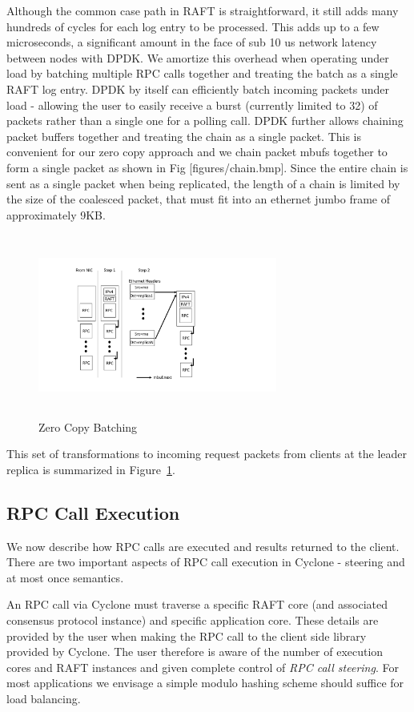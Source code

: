 \documentclass[letterpaper,twocolumn,10pt]{article}
\begin{document}
Although the common case path in RAFT is straightforward, it still adds many
hundreds of cycles for each log entry to be processed. This adds up to a few
microseconds, a significant amount in the face of sub 10 us network latency
between nodes with DPDK. We amortize this overhead when operating under load by
batching multiple RPC calls together and treating the batch as a single RAFT log
entry.  DPDK by itself can efficiently batch incoming packets under load -
allowing the user to easily receive a burst (currently limited to 32) of packets
rather than a single one for a polling call. DPDK further allows chaining packet
buffers together and treating the chain as a single packet. This is convenient
for our zero copy approach and we chain packet mbufs together to form a single
packet as shown in Fig [figures/chain.bmp]. Since the entire chain is sent as a
single packet when being replicated, the length of a chain is limited by the
size of the coalesced packet, that must fit into an ethernet jumbo frame of
approximately 9KB.

\begin{figure}
\includegraphics[width=0.7\textwidth,height=6cm]{figures/chain.pdf}
\caption{Zero Copy Batching}
\label{fig:zc_batch}
\end{figure}

This set of transformations to incoming request packets from clients at the
leader replica is summarized in Figure~\ref{fig:zc_batch}. 

\subsection{RPC Call Execution}
\label{sec:exec}
We now describe how RPC calls are executed and results returned to the
client. There are two important aspects of RPC call execution in Cyclone -
steering and at most once semantics.

An RPC call via Cyclone must traverse a specific RAFT core (and associated
consensus protocol instance) and specific application core. These details are
provided by the user when making the RPC call to the client side library
provided by Cyclone. The user therefore is aware of the number of execution
cores and RAFT instances and given complete control of \emph{RPC call steering}.
For most applications we envisage a simple modulo hashing scheme should suffice
for load balancing.
\end{document}
